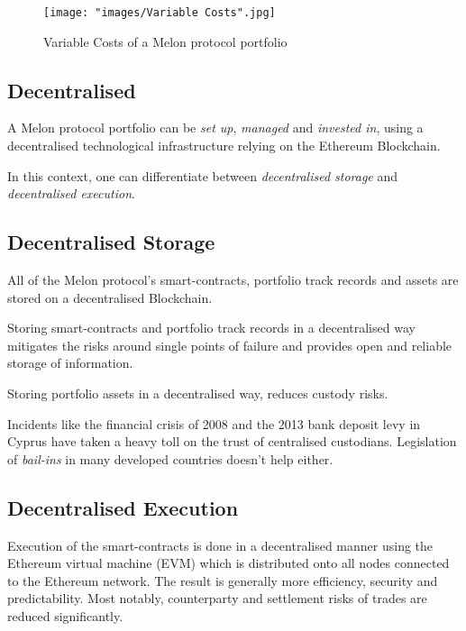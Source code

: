 \documentclass[9pt,oneside]{amsart}
\theoremstyle{plain}
\begin{document}
\begin{figure}[ht!]
	\centering
	\texttt{[image: "images/Variable Costs".jpg]}
	\caption{Variable Costs of a Melon protocol portfolio}
	\label{fig:fees}
\end{figure}

\begin{multicols}{2}

\section{Decentralised}\label{sec:decentralised}

A Melon protocol portfolio can be \textit{set up}, \textit{managed} and \textit{invested in}, using a decentralised technological infrastructure relying on the Ethereum Blockchain.

In this context, one can differentiate between \textit{decentralised storage} and \textit{decentralised execution}.

\subsection{Decentralised Storage}

All of the Melon protocol's smart-contracts, portfolio track records and assets are stored on a decentralised Blockchain. 

Storing smart-contracts and portfolio track records in a decentralised way mitigates the risks around single points of failure and provides open and reliable storage of information.

Storing portfolio assets in a decentralised way, reduces custody risks.

Incidents like the financial crisis of 2008 and the 2013 bank deposit levy in Cyprus have taken a heavy toll on the trust of centralised custodians. Legislation of \textit{bail-ins} in many developed countries doesn't help either\cite{bailinsch}\cite{bailinseu}.

\subsection{Decentralised Execution}

Execution of the smart-contracts is done in a decentralised manner using the Ethereum virtual machine (EVM) which is distributed onto all nodes connected to the Ethereum network. The result is generally more efficiency, security and predictability. Most notably, counterparty and settlement risks of trades are reduced significantly.


\end{multicols}
\end{document}
